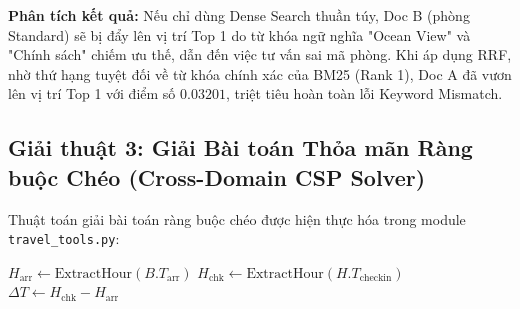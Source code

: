 \textbf{Phân tích kết quả:} Nếu chỉ dùng Dense Search thuần túy, Doc B (phòng Standard) sẽ bị đẩy lên vị trí Top 1 do từ khóa ngữ nghĩa "Ocean View" và "Chính sách" chiếm ưu thế, dẫn đến việc tư vấn sai mã phòng. Khi áp dụng RRF, nhờ thứ hạng tuyệt đối về từ khóa chính xác của BM25 (Rank 1), Doc A đã vươn lên vị trí Top 1 với điểm số $0.03201$, triệt tiêu hoàn toàn lỗi Keyword Mismatch.

\subsection{Giải thuật 3: Giải Bài toán Thỏa mãn Ràng buộc Chéo (Cross-Domain CSP Solver)}
\label{subsec:algo3_csp_solver}

Thuật toán giải bài toán ràng buộc chéo được hiện thực hóa trong module \texttt{travel\_tools.py}:

\begin{algorithm}[H]
\DontPrintSemicolon
\SetAlgoLined
{}
\BlankLine
$H_{\text{arr}} \leftarrow \text{ExtractHour}(B.T_{\text{arr}})$\;
$H_{\text{chk}} \leftarrow \text{ExtractHour}(H.T_{\text{checkin}})$\;
$\Delta T \leftarrow H_{\text{chk}} - H_{\text{arr}}$\;
\BlankLine
{}
\;
\caption{Thuật toán Đánh giá Ràng buộc Thời gian Chéo (Cross-Domain Temporal CSP)}
\label{algo:csp_solver}
\end{algorithm}
